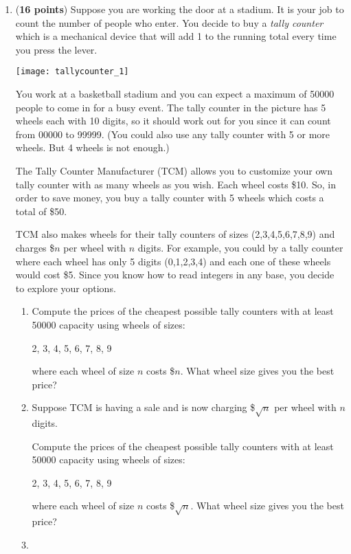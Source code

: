 \documentclass[10pt,letterpaper,unboxed,cm]{article}
\begin{document}
\begin{enumerate}
    \item ({\bf 16 points})
Suppose you are working the door at a stadium. It is your job to count the number of people who enter. You decide to buy a \emph{tally counter} which is a mechanical device that will add 1 to the running total every time you press the lever.

\texttt{[image: tallycounter\_1]}

You work at a basketball stadium and you can expect a maximum of 50000 people to come in for a busy event. The tally counter in the picture has 5 wheels each with 10 digits, so it should work out for you since it can count from 00000 to 99999. (You could also use any tally counter with 5 or more wheels. But 4 wheels is not enough.)

The Tally Counter Manufacturer (TCM) allows you to customize your own tally counter with as many wheels as you wish. Each wheel costs \$10. So, in order to save money, you buy a tally counter with 5 wheels which costs a total of \$50.

TCM also makes wheels for their tally counters of sizes (2,3,4,5,6,7,8,9) and charges \$$n$ per wheel with $n$ digits. For example, you could by a tally counter where each wheel has only 5 digits (0,1,2,3,4) and each one of these wheels would cost \$5. Since you know how to read integers in any base, you decide to explore your options.

\begin{enumerate}
\item
Compute the prices of the cheapest possible tally counters with at least 50000 capacity using wheels of sizes:
\begin{center}
2, 3, 4, 5, 6, 7, 8, 9
\end{center} 
where each wheel of size $n$ costs \$$n$.
What wheel size gives you the best price?
\item
Suppose TCM is having a sale and is now charging \$$\sqrt{n}$ per wheel with $n$ digits.

Compute the prices of the cheapest possible tally counters with at least 50000 capacity using wheels of sizes:
\begin{center}
2, 3, 4, 5, 6, 7, 8, 9
\end{center} 
where each wheel of size $n$ costs \$$\sqrt{n}$.
What wheel size gives you the best price?
\item

\end{enumerate}




\end{enumerate}
\end{document}
